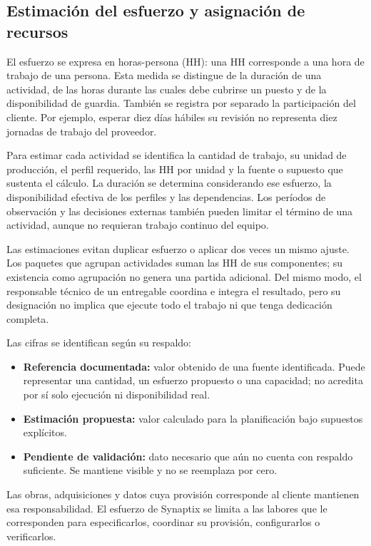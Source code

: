 \subsection{Estimación del esfuerzo y asignación de recursos}
El esfuerzo se expresa en horas-persona (HH): una HH corresponde a una hora de trabajo de una persona. Esta medida se distingue de la duración de una actividad, de las horas durante las cuales debe cubrirse un puesto y de la disponibilidad de guardia. También se registra por separado la participación del cliente. Por ejemplo, esperar diez días hábiles su revisión no representa diez jornadas de trabajo del proveedor.

Para estimar cada actividad se identifica la cantidad de trabajo, su unidad de producción, el perfil requerido, las HH por unidad y la fuente o supuesto que sustenta el cálculo. La duración se determina considerando ese esfuerzo, la disponibilidad efectiva de los perfiles y las dependencias. Los períodos de observación y las decisiones externas también pueden limitar el término de una actividad, aunque no requieran trabajo continuo del equipo.

Las estimaciones evitan duplicar esfuerzo o aplicar dos veces un mismo ajuste. Los paquetes que agrupan actividades suman las HH de sus componentes; su existencia como agrupación no genera una partida adicional. Del mismo modo, el responsable técnico de un entregable coordina e integra el resultado, pero su designación no implica que ejecute todo el trabajo ni que tenga dedicación completa.

Las cifras se identifican según su respaldo:
\begin{itemize}
\item \textbf{Referencia documentada:} valor obtenido de una fuente identificada. Puede representar una cantidad, un esfuerzo propuesto o una capacidad; no acredita por sí solo ejecución ni disponibilidad real.
\item \textbf{Estimación propuesta:} valor calculado para la planificación bajo supuestos explícitos.
\item \textbf{Pendiente de validación:} dato necesario que aún no cuenta con respaldo suficiente. Se mantiene visible y no se reemplaza por cero.
\end{itemize}

Las obras, adquisiciones y datos cuya provisión corresponde al cliente mantienen esa responsabilidad. El esfuerzo de Synaptix se limita a las labores que le corresponden para especificarlos, coordinar su provisión, configurarlos o verificarlos.

